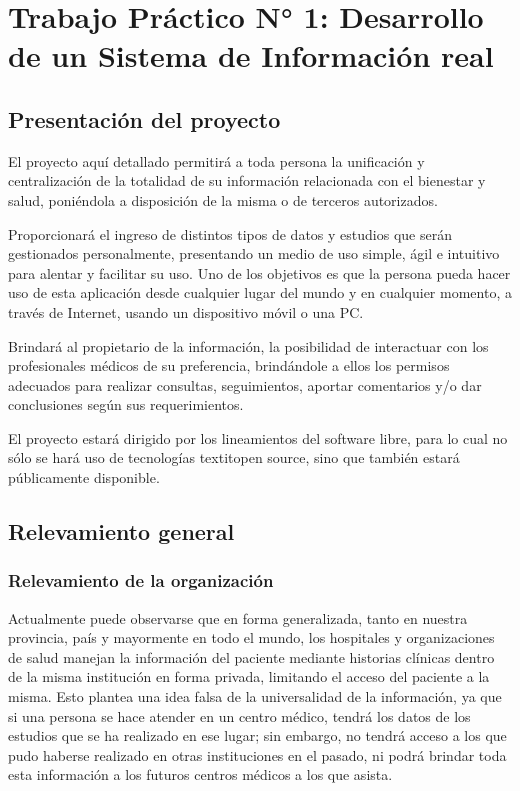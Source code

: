 \section{Trabajo Práctico N° 1: Desarrollo de un Sistema de Información real}

\subsection{Presentación del proyecto}
El proyecto aquí detallado permitirá a toda persona la unificación y centralización de la totalidad de su información relacionada con el bienestar y salud, poniéndola a disposición de la misma o de terceros autorizados.

Proporcionará el ingreso de distintos tipos de datos y estudios que serán gestionados personalmente, presentando un medio de uso simple, ágil e intuitivo para alentar y facilitar su uso.
Uno de los objetivos es que la persona pueda hacer uso de esta aplicación desde cualquier lugar del mundo y en cualquier momento, a través de Internet, usando un dispositivo móvil o una PC.

Brindará al propietario de la información, la posibilidad  de interactuar con los profesionales médicos de su preferencia, brindándole a ellos los permisos adecuados para realizar consultas, seguimientos, aportar comentarios y/o dar conclusiones según sus requerimientos.

El proyecto estará dirigido por los lineamientos del software libre, para lo cual no sólo se hará uso de tecnologías textit{open source}, sino que también estará públicamente disponible.


\subsection{Relevamiento general}

\subsubsection{Relevamiento de la organización}

Actualmente puede observarse que en forma generalizada, tanto en nuestra provincia, país y mayormente en todo el mundo, los hospitales y organizaciones de salud manejan la información del paciente mediante historias clínicas dentro de la misma institución en forma privada, limitando el acceso del paciente a la misma.
Esto plantea una idea falsa de la universalidad de la información, ya que si una persona se hace atender en un centro médico, tendrá los datos de los estudios que se ha realizado en ese lugar; sin embargo, no tendrá acceso a los que pudo haberse realizado en otras instituciones en el pasado, ni podrá brindar toda esta información a los futuros centros médicos a los que asista.

